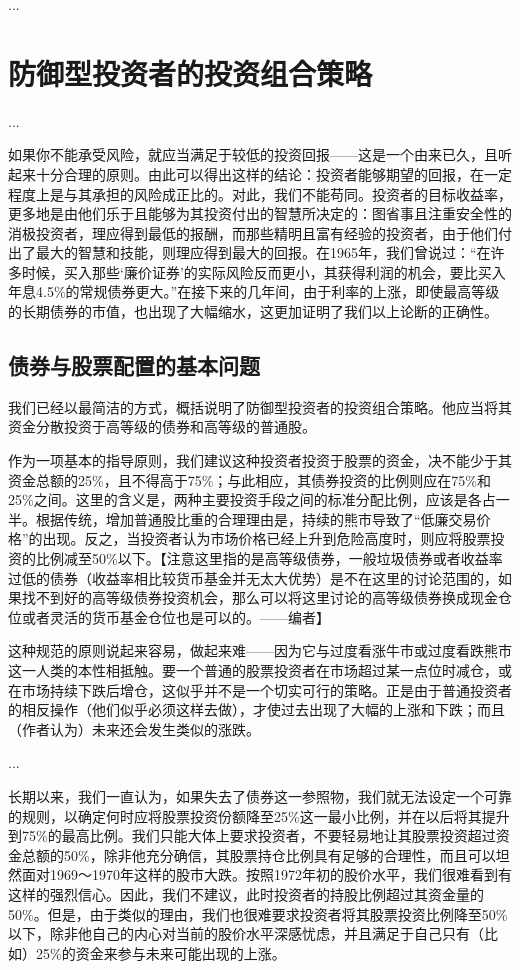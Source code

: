 \documentclass[12pt,oneside]{book}
\begin{document}
...

\section{防御型投资者的投资组合策略}
...

如果你不能承受风险，就应当满足于较低的投资回报——这是一个由来已久，且听起来十分合理的原则。由此可以得出这样的结论：投资者能够期望的回报，在一定程度上是与其承担的风险成正比的。对此，我们不能苟同。投资者的目标收益率，更多地是由他们乐于且能够为其投资付出的智慧所决定的：图省事且注重安全性的消极投资者，理应得到最低的报酬，而那些精明且富有经验的投资者，由于他们付出了最大的智慧和技能，则理应得到最大的回报。在1965年，我们曾说过：“在许多时候，买入那些‘廉价证券’的实际风险反而更小，其获得利润的机会，要比买入年息4.5\%的常规债券更大。”在接下来的几年间，由于利率的上涨，即使最高等级的长期债券的市值，也出现了大幅缩水，这更加证明了我们以上论断的正确性。


\subsection{债券与股票配置的基本问题}
我们已经以最简洁的方式，概括说明了防御型投资者的投资组合策略。他应当将其资金分散投资于高等级的债券和高等级的普通股。

作为一项基本的指导原则，我们建议这种投资者投资于股票的资金，决不能少于其资金总额的25\%，且不得高于75\%；与此相应，其债券投资的比例则应在75\%和25\%之间。这里的含义是，两种主要投资手段之间的标准分配比例，应该是各占一半。根据传统，增加普通股比重的合理理由是，持续的熊市导致了“低廉交易价格”的出现。反之，当投资者认为市场价格已经上升到危险高度时，则应将股票投资的比例减至50\%以下。【注意这里指的是高等级债券，一般垃圾债券或者收益率过低的债券（收益率相比较货币基金并无太大优势）是不在这里的讨论范围的，如果找不到好的高等级债券投资机会，那么可以将这里讨论的高等级债券换成现金仓位或者灵活的货币基金仓位也是可以的。——编者】

这种规范的原则说起来容易，做起来难——因为它与过度看涨牛市或过度看跌熊市这一人类的本性相抵触。要一个普通的股票投资者在市场超过某一点位时减仓，或在市场持续下跌后增仓，这似乎并不是一个切实可行的策略。正是由于普通投资者的相反操作（他们似乎必须这样去做），才使过去出现了大幅的上涨和下跌；而且（作者认为）未来还会发生类似的涨跌。

...

长期以来，我们一直认为，如果失去了债券这一参照物，我们就无法设定一个可靠的规则，以确定何时应将股票投资份额降至25\%这一最小比例，并在以后将其提升到75\%的最高比例。我们只能大体上要求投资者，不要轻易地让其股票投资超过资金总额的50\%，除非他充分确信，其股票持仓比例具有足够的合理性，而且可以坦然面对1969～1970年这样的股市大跌。按照1972年初的股价水平，我们很难看到有这样的强烈信心。因此，我们不建议，此时投资者的持股比例超过其资金量的50\%。但是，由于类似的理由，我们也很难要求投资者将其股票投资比例降至50\%以下，除非他自己的内心对当前的股价水平深感忧虑，并且满足于自己只有（比如）25\%的资金来参与未来可能出现的上涨。
\end{document}
